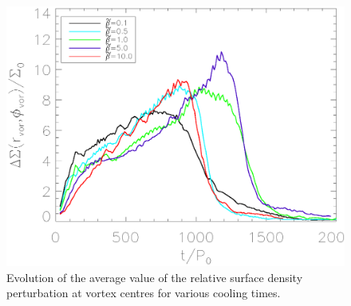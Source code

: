 
\begin{figure}
  \includegraphics[width=\linewidth,clip=true,trim=0.5cm
  0cm 0cm 1cm]{figures/vortex_density}
  \caption{Evolution of the average value of the relative surface density perturbation
    at vortex centres for various cooling
    times. %
    \label{overdensity}}     
\end{figure}








